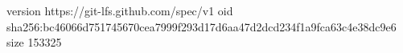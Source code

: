 version https://git-lfs.github.com/spec/v1
oid sha256:bc46066d751745670cea7999f293d17d6aa47d2dcd234f1a9fca63c4e38dc9e6
size 153325
